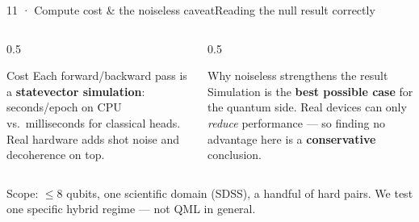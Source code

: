 \begin{frame}{11 · Compute cost \& the noiseless caveat}{Reading the null result correctly}
    \begin{columns}[T]
        \begin{column}{0.5\textwidth}
            \begin{alertblock}{Cost}
                Each forward/backward pass is a \textbf{statevector simulation}:
                seconds/epoch on CPU vs.\ milliseconds for classical heads. Real
                hardware adds shot noise and decoherence on top.
            \end{alertblock}
        \end{column}
        \begin{column}{0.5\textwidth}
            \begin{block}{Why noiseless strengthens the result}
                Simulation is the \textbf{best possible case} for the quantum side.
                Real devices can only \emph{reduce} performance --- so finding no
                advantage here is a \textbf{conservative} conclusion.
            \end{block}
        \end{column}
    \end{columns}
    \begin{callout}
        Scope: $\leq 8$ qubits, one scientific domain (SDSS), a handful of hard pairs.
        We test one specific hybrid regime --- not QML in general.
    \end{callout}
\end{frame}

